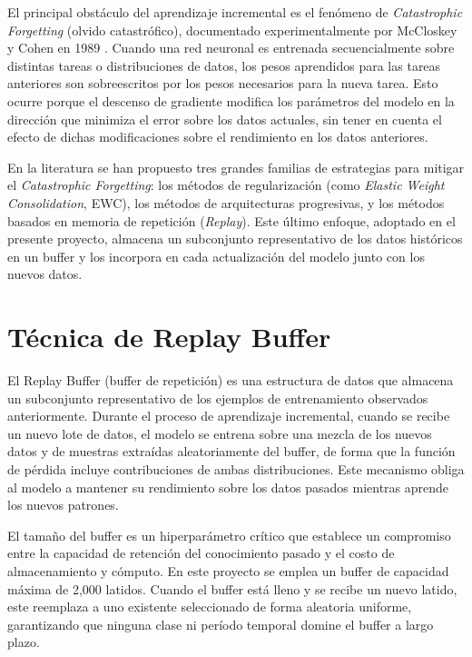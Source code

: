 El principal obstáculo del aprendizaje incremental es el fenómeno de \textit{Catastrophic Forgetting} (olvido catastrófico), documentado experimentalmente por McCloskey y Cohen en 1989 \cite{McCloskey1989}. Cuando una red neuronal es entrenada secuencialmente sobre distintas tareas o distribuciones de datos, los pesos aprendidos para las tareas anteriores son sobreescritos por los pesos necesarios para la nueva tarea. Esto ocurre porque el descenso de gradiente modifica los parámetros del modelo en la dirección que minimiza el error sobre los datos actuales, sin tener en cuenta el efecto de dichas modificaciones sobre el rendimiento en los datos anteriores.

En la literatura se han propuesto tres grandes familias de estrategias para mitigar el \textit{Catastrophic Forgetting}: los métodos de regularización (como \textit{Elastic Weight Consolidation}, EWC), los métodos de arquitecturas progresivas, y los métodos basados en memoria de repetición (\textit{Replay}). Este último enfoque, adoptado en el presente proyecto, almacena un subconjunto representativo de los datos históricos en un buffer y los incorpora en cada actualización del modelo junto con los nuevos datos.

\section{Técnica de Replay Buffer}

El Replay Buffer (buffer de repetición) es una estructura de datos que almacena un subconjunto representativo de los ejemplos de entrenamiento observados anteriormente. Durante el proceso de aprendizaje incremental, cuando se recibe un nuevo lote de datos, el modelo se entrena sobre una mezcla de los nuevos datos y de muestras extraídas aleatoriamente del buffer, de forma que la función de pérdida incluye contribuciones de ambas distribuciones. Este mecanismo obliga al modelo a mantener su rendimiento sobre los datos pasados mientras aprende los nuevos patrones.

El tamaño del buffer es un hiperparámetro crítico que establece un compromiso entre la capacidad de retención del conocimiento pasado y el costo de almacenamiento y cómputo. En este proyecto se emplea un buffer de capacidad máxima de 2,000 latidos. Cuando el buffer está lleno y se recibe un nuevo latido, este reemplaza a uno existente seleccionado de forma aleatoria uniforme, garantizando que ninguna clase ni período temporal domine el buffer a largo plazo.

